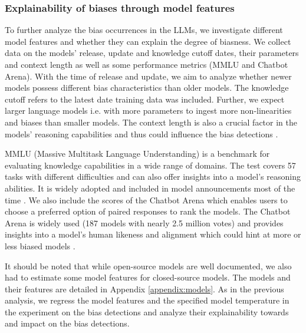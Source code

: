 \subsubsection{Explainability of biases through model features}
\par To further analyze the bias occurrences in the LLMs, we investigate different model features and whether they can explain the degree of biasness. We collect data on the models' release, update and knowledge cutoff dates, their parameters and context length as well as some performance metrics (MMLU and Chatbot Arena). With the time of release and update, we aim to analyze whether newer models possess different bias characteristics than older models. The knowledge cutoff refers to the latest date training data was included. Further, we expect larger language models i.e. with more parameters to ingest more non-linearities and biases than smaller models. The context length is also a crucial factor in the models' reasoning capabilities and thus could influence the bias detections \parencite{naveed2023comprehensive, zhao2023survey}.

\par MMLU (Massive Multitask Language Understanding) is a benchmark for evaluating knowledge capabilities in a wide range of domains. The test covers 57 tasks with different difficulties and can also offer insights into a model's reasoning abilities. It is widely adopted and included in model announcements most of the time \parencite{hendrycks2020measuring}. We also include the scores of the Chatbot Arena which enables users to choose a preferred option of paired responses to rank the models. The Chatbot Arena is widely used (187 models with nearly 2.5 million votes) and provides insights into a model's human likeness and alignment which could hint at more or less biased models \parencite{chiang2024chatbot, huggingface2024chatbotarena}.

\par It should be noted that while open-source models are well documented, we also had to estimate some model features for closed-source models. The models and their features are detailed in Appendix \ref{appendix:models}. As in the previous analysis, we regress the model features and the specified model temperature in the experiment on the bias detections and analyze their explainability towards and impact on the bias detections.